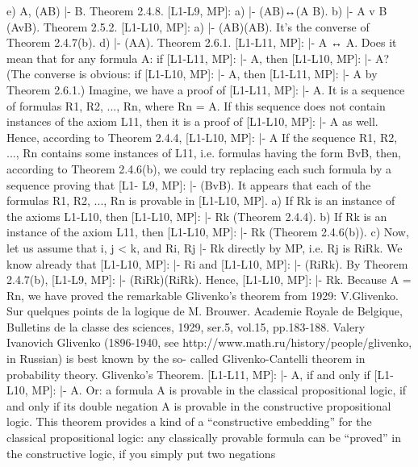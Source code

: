 e) \neg \neg A, \neg \neg (A\IMPLIES B) |- \neg \neg B.
Theorem 2.4.8. [L1-L9, MP]: a) |- \neg \neg (A\AND B)↔(\neg \neg A \AND  \neg \neg B).
b) |- \neg \neg A v \neg \neg B \IMPLIES  \neg \neg (AvB).
Theorem 2.5.2. [L1-L10, MP]: a) |- (\neg \neg A\IMPLIES \neg \neg B)\IMPLIES \neg \neg (A\IMPLIES B). It's the converse of Theorem 2.4.7(b).
d) |- \neg \neg (\neg \neg A\IMPLIES A).
Theorem 2.6.1. [L1-L11, MP]: |- \neg \neg A ↔ A.
Does it mean that for any formula A: if [L1-L11, MP]: |- A, then [L1-L10, MP]: |- \neg \neg A? (The converse is
obvious: if [L1-L10, MP]: |- \neg \neg A, then [L1-L11, MP]: |- A by Theorem 2.6.1.)
Imagine, we have a proof of [L1-L11, MP]: |- A. It is a sequence of formulas R1, R2, ..., Rn, where Rn = A.
If this sequence does not contain instances of the axiom L11, then it is a proof of [L1-L10, MP]: |- A as
well. Hence, according to Theorem 2.4.4, [L1-L10, MP]: |- \neg \neg A
If the sequence R1, R2, ..., Rn contains some instances of L11, i.e. formulas having the form Bv\neg B, then,
according to Theorem 2.4.6(b), we could try replacing each such formula by a sequence proving that [L1-
L9, MP]: |- \neg \neg (Bv\neg B). It appears that each of the formulas \neg \neg R1, \neg \neg R2, ..., \neg \neg Rn is provable in [L1-L10,
MP].
a) If Rk is an instance of the axioms L1-L10, then [L1-L10, MP]: |- \neg \neg Rk (Theorem 2.4.4).
b) If Rk is an instance of the axiom L11, then [L1-L10, MP]: |- \neg \neg Rk (Theorem 2.4.6(b)).
c) Now, let us assume that i, j < k, and Ri, Rj |- Rk directly by MP, i.e. Rj is Ri\IMPLIES Rk. We know already that
[L1-L10, MP]: |- \neg \neg Ri and [L1-L10, MP]: |- \neg \neg (Ri\IMPLIES Rk). By Theorem 2.4.7(b), [L1-L9, MP]: |-
\neg \neg (Ri\IMPLIES Rk)\IMPLIES (\neg \neg Ri\IMPLIES \neg \neg Rk). Hence, [L1-L10, MP]: |- \neg \neg Rk.
Because A = Rn, we have proved the remarkable Glivenko's theorem from 1929:
V.Glivenko. Sur quelques points de la logique de M. Brouwer. Academie Royale de Belgique, Bulletins de la classe des
sciences, 1929, ser.5, vol.15, pp.183-188.
Valery Ivanovich Glivenko (1896-1940, see http://www.math.ru/history/people/glivenko, in Russian) is best known by the so-
called Glivenko-Cantelli theorem in probability theory.
Glivenko's Theorem. [L1-L11, MP]: |- A, if and only if [L1-L10, MP]: |- \neg \neg A. Or: a formula A is provable
in the classical propositional logic, if and only if its double negation \neg \neg A is provable in the constructive
propositional logic.
This theorem provides a kind of a ``constructive embedding'' for the classical propositional logic: any
classically provable formula can be ``proved'' in the constructive logic, if you simply put two negations
